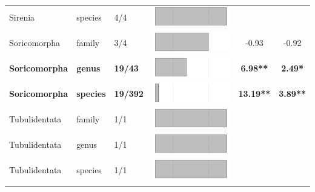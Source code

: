 \begin{longtable}{lL{1.8cm}C{2cm}ccc}
  Sirenia & species & 4/4 & \includegraphics[width=0.20\linewidth, height=0.05\linewidth]{Missing_mammals/Table_figures/bar78.pdf} &   &   \\ 
  Soricomorpha & family & 3/4 & \includegraphics[width=0.20\linewidth, height=0.05\linewidth]{Missing_mammals/Table_figures/bar79.pdf} & -0.93 & -0.92 \\ 
  \textbf{Soricomorpha} & \textbf{genus} & \textbf{19/43} & \includegraphics[width=0.20\linewidth, height=0.05\linewidth]{Missing_mammals/Table_figures/bar80.pdf} & \textbf{6.98**} & \textbf{2.49*} \\ 
  \textbf{Soricomorpha} & \textbf{species} & \textbf{19/392} & \includegraphics[width=0.20\linewidth, height=0.05\linewidth]{Missing_mammals/Table_figures/bar81.pdf} & \textbf{13.19**} & \textbf{3.89**} \\ 
  Tubulidentata & family & 1/1 & \includegraphics[width=0.20\linewidth, height=0.05\linewidth]{Missing_mammals/Table_figures/bar82.pdf} &   &   \\ 
  Tubulidentata & genus & 1/1 & \includegraphics[width=0.20\linewidth, height=0.05\linewidth]{Missing_mammals/Table_figures/bar83.pdf} &   &   \\ 
  Tubulidentata & species & 1/1 & \includegraphics[width=0.20\linewidth, height=0.05\linewidth]{Missing_mammals/Table_figures/bar84.pdf} &   &   \\ 
   \hline
\hline
\label{Table_results}
\end{longtable}
